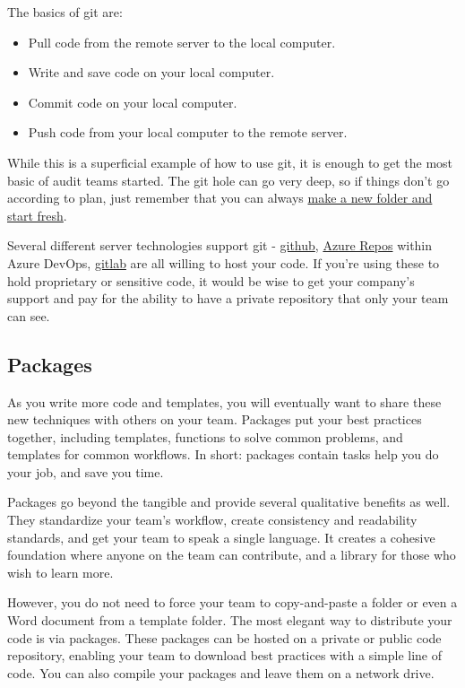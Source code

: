 \documentclass[
]{book}
\providecommand{\tightlist}{%
  \setlength{\itemsep}{0pt}\setlength{\parskip}{0pt}}
\begin{document}
The basics of git are:

\begin{itemize}
\tightlist
\item
  Pull code from the remote server to the local computer.
\item
  Write and save code on your local computer.
\item
  Commit code on your local computer.
\item
  Push code from your local computer to the remote server.
\end{itemize}

While this is a superficial example of how to use git, it is enough to get the most basic of audit teams started. The git hole can go very deep, so if things don't go according to plan, just remember that you can always \href{https://xkcd.com/1597/}{make a new folder and start fresh}.

Several different server technologies support git - \href{https://github.com}{github}, \href{https://azure.microsoft.com/en-us/services/devops/repos/}{Azure Repos} within Azure DevOps, \href{https://gitlab.com}{gitlab} are all willing to host your code. If you're using these to hold proprietary or sensitive code, it would be wise to get your company's support and pay for the ability to have a private repository that only your team can see.

\hypertarget{packages}{%
\subsection{Packages}\label{packages}}

As you write more code and templates, you will eventually want to share these new techniques with others on your team. Packages put your best practices together, including templates, functions to solve common problems, and templates for common workflows. In short: packages contain tasks help you do your job, and save you time.

Packages go beyond the tangible and provide several qualitative benefits as well. They standardize your team's workflow, create consistency and readability standards, and get your team to speak a single language. It creates a cohesive foundation where anyone on the team can contribute, and a library for those who wish to learn more.

However, you do not need to force your team to copy-and-paste a folder or even a Word document from a template folder. The most elegant way to distribute your code is via packages. These packages can be hosted on a private or public code repository, enabling your team to download best practices with a simple line of code. You can also compile your packages and leave them on a network drive.
\end{document}
